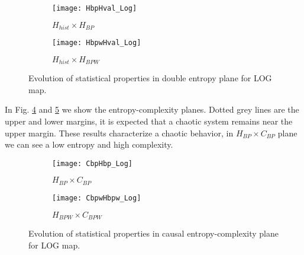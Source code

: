 \begin{figure}[htpb]
	\centering
	\begin{subfigure}[b]{0.49\textwidth}
		\texttt{[image: HbpHval\_Log]}
		\caption{$H_{hist} \times H_{BP}$}
		\label{fig:HbpHval_Log}
	\end{subfigure}
	\begin{subfigure}[b]{0.49\textwidth}
		\texttt{[image: HbpwHval\_Log]}
		\caption{$H_{hist} \times H_{BPW}$}
		\label{fig:HbpwHval_Log}
	\end{subfigure}
	\caption{Evolution of statistical properties in double entropy plane for LOG map.}
	\label{fig:LOG_HH}
\end{figure}

In Fig. \ref{fig:CbpHbp_Log} and \ref{fig:CbpwHbpw_Log} we show the entropy-complexity planes.
Dotted grey lines are the upper and lower margins, it is expected that a chaotic system remains near the upper margin.
These results characterize a chaotic behavior, in $H_{BP} \times C_{BP}$ plane we can see a low entropy and high complexity.

\begin{figure}[htpb]
	\centering
	\begin{subfigure}[b]{0.49\textwidth}
		\texttt{[image: CbpHbp\_Log]}
		\caption{$H_{BP} \times C_{BP}$}
		\label{fig:CbpHbp_Log}
	\end{subfigure}
	\begin{subfigure}[b]{0.49\textwidth}
		\texttt{[image: CbpwHbpw\_Log]}
		\caption{$H_{BPW} \times C_{BPW}$}
		\label{fig:CbpwHbpw_Log}
	\end{subfigure}
	\caption{Evolution of statistical properties in causal entropy-complexity plane for LOG map.}
	\label{fig:LOG_HC}
\end{figure}
